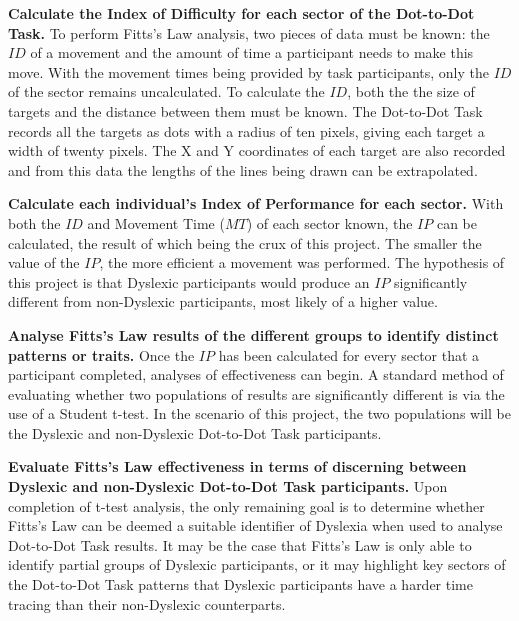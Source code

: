 			\textbf{Calculate the Index of Difficulty for each sector of the Dot-to-Dot Task.}
			To perform Fitts’s Law analysis, two pieces of data must be known: the \(ID\) of a movement and the amount of time a participant needs to make this move. With the movement times being provided by task participants, only the \(ID\) of the sector remains uncalculated. To calculate the \(ID\), both the the size of targets and the distance between them must be known. The Dot-to-Dot Task records all the targets as dots with a radius of ten pixels, giving each target a width of twenty pixels. The X and Y coordinates of each target are also recorded and from this data the lengths of the lines being drawn can be extrapolated.
			
			\textbf{Calculate each individual's Index of Performance for each sector.}
			With both the \(ID\) and Movement Time (\(MT\)) of each sector known, the \(IP\) can be calculated, the result of which being the crux of this project. The smaller the value of the \(IP\), the more efficient a movement was performed. The hypothesis of this project is that Dyslexic participants would produce an \(IP\) significantly different from non-Dyslexic participants, most likely of a higher value.
			
			\textbf{Analyse Fitts’s Law results of the different groups to identify distinct patterns or traits.}
			Once the \(IP\) has been calculated for every sector that a participant completed, analyses of effectiveness can begin. A standard method of evaluating whether two populations of results are significantly different is via the use of a Student t-test. In the scenario of this project, the two populations will be the Dyslexic and non-Dyslexic Dot-to-Dot Task participants.
			
			\textbf{Evaluate Fitts’s Law effectiveness in terms of discerning between Dyslexic and non-Dyslexic Dot-to-Dot Task participants.}
			Upon completion of t-test analysis, the only remaining goal is to determine whether Fitts’s Law can be deemed a suitable identifier of Dyslexia when used to analyse Dot-to-Dot Task results. It may be the case that Fitts’s Law is only able to identify partial groups of Dyslexic participants, or it may highlight key sectors of the Dot-to-Dot Task patterns that Dyslexic participants have a harder time tracing than their non-Dyslexic counterparts.
			
\newpage